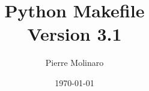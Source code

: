 \documentclass[a4paper,11pt]{extarticle}
\begin{document}
 


\title{\bf \Huge{Python Makefile\\Version 3.1}}
\author{Pierre Molinaro}
\date {\today}

\maketitle


\tableofcontents

\end{document}

